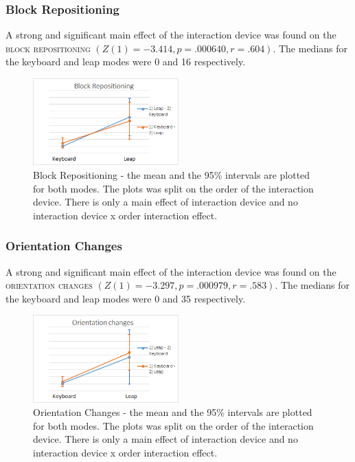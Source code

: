 \subsubsection{Block Repositioning}

A strong and significant main effect of the interaction device was found on the \textsc{block repositioning} $(Z(1) = -3.414, p = .000640, r = .604)$. The medians for the keyboard and leap modes were 0 and 16 respectively.

\begin{figure}[!htbp]
\centering
\includegraphics[width=0.5\textwidth]{imgs/results/block_repositioning}
\caption{Block Repositioning - the mean and the 95\% intervals are plotted for both modes. The plots was split on the order of the interaction device. There is only a main effect of interaction device and no interaction device x order interaction effect.}
\label{fig:block_repositioning}
\end{figure}

\subsubsection{Orientation Changes}

A strong and significant main effect of the interaction device was found on the \textsc{orientation changes} $(Z(1) = -3.297, p = .000979, r = .583)$. The medians for the keyboard and leap modes were 0 and 35 respectively.

\begin{figure}[!htbp]
\centering
\includegraphics[width=0.5\textwidth]{imgs/results/orientation_changes}
\caption{Orientation Changes - the mean and the 95\% intervals are plotted for both modes. The plots was split on the order of the interaction device. There is only a main effect of interaction device and no interaction device x order interaction effect.}
\label{fig:orientation_changes}
\end{figure}




